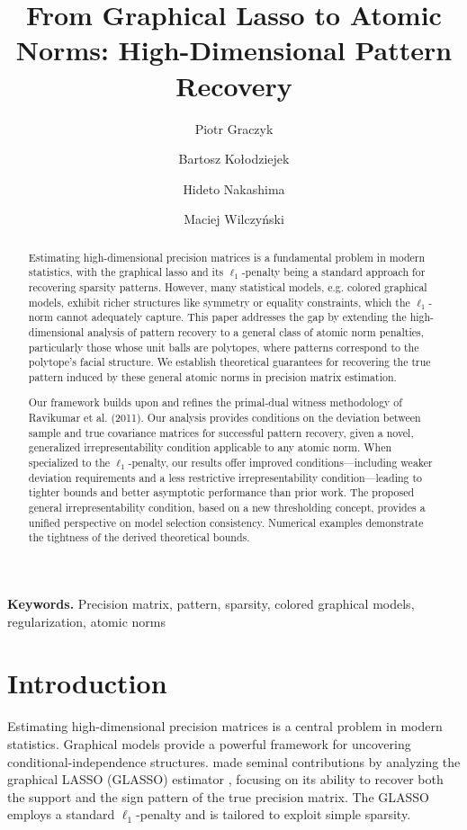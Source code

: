 \documentclass[12pt]{amsart}
\title[From Graphical Lasso to Atomic Norms]{From Graphical Lasso to Atomic Norms: High-Dimensional Pattern Recovery}
\author[P. Graczyk]{Piotr Graczyk}
\author[B. Kołodziejek]{Bartosz Kołodziejek \orcidlink{0000-0002-5220-9012}}
\author[H. Nakashima]{Hideto Nakashima}
\author[M. Wilczyński]{Maciej Wilczyński}
\numberwithin{equation}{section}
\numberwithin{equation}{section}
\theoremstyle{definition}
\begin{document}
\begin{abstract}
Estimating high-dimensional precision matrices is a fundamental problem in modern statistics, with the graphical lasso and its $\ell_1$-penalty being a standard approach for recovering sparsity patterns. However, many statistical models, e.g. colored graphical models, exhibit richer structures like symmetry or equality constraints, which the $\ell_1$-norm cannot adequately capture. This paper addresses the gap by extending the high-dimensional analysis of pattern recovery to a general class of atomic norm penalties, particularly those whose unit balls are polytopes, where patterns correspond to the polytope's facial structure. We establish theoretical guarantees for recovering the true pattern induced by these general atomic norms in precision matrix estimation. 

Our framework builds upon and refines the primal-dual witness methodology of Ravikumar et al. (2011). Our analysis provides conditions on the deviation between sample and true covariance matrices for successful pattern recovery, given a novel, generalized irrepresentability condition applicable to any atomic norm. When specialized to the $\ell_1$-penalty, our results offer improved conditions---including weaker deviation requirements and a less restrictive irrepresentability condition---leading to tighter bounds and better asymptotic performance than prior work. The proposed general irrepresentability condition, based on a new thresholding concept, provides a unified perspective on model selection consistency. Numerical examples demonstrate the tightness of the derived theoretical bounds.
\end{abstract}



\maketitle
\smallskip
\noindent \textbf{Keywords.} Precision matrix, pattern, sparsity, colored graphical models, regularization, atomic norms


\section{Introduction}

Estimating high-dimensional precision matrices is a central problem in modern statistics. Graphical models provide a powerful framework for uncovering conditional-independence structures.  \citet{Ravi2008, ravikumar2011graphical} made seminal contributions by analyzing the graphical LASSO (GLASSO) estimator \citep{YuanLi07, glasso3, Friedman2008}, focusing on its ability to recover both the support and the sign pattern of the true precision matrix. The GLASSO employs a standard $\ell_1$-penalty and is tailored to exploit simple sparsity.
\end{document}
